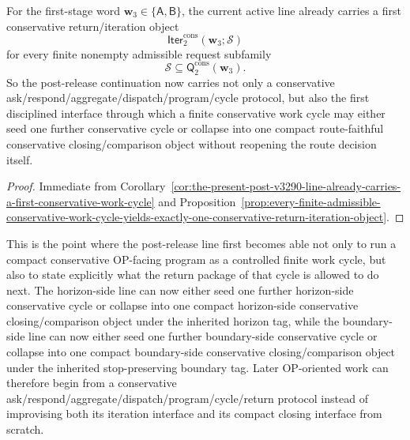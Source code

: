 \begin{corollary}
\label{cor:the-present-post-v3290-line-already-carries-a-first-conservative-return-iteration-interface}
For the first-stage word \(\mathbf w_3\in\{\mathsf A,\mathsf B\}\), the current active line already carries a first conservative return/iteration object
\[
  \mathsf{Iter}^{\mathrm{cons}}_{2}(\mathbf w_3;\mathcal S)
\]
for every finite nonempty admissible request subfamily
\[
  \mathcal S\subseteq \mathsf{Q}^{\mathrm{cons}}_{2}(\mathbf w_3).
\]
So the post-release continuation now carries not only a conservative ask/respond/aggregate/dispatch/program/cycle protocol, but also the first disciplined interface through which a finite conservative work cycle may either seed one further conservative cycle or collapse into one compact route-faithful conservative closing/comparison object without reopening the route decision itself.
\end{corollary}

\begin{proof}
Immediate from Corollary~\ref{cor:the-present-post-v3290-line-already-carries-a-first-conservative-work-cycle} and Proposition~\ref{prop:every-finite-admissible-conservative-work-cycle-yields-exactly-one-conservative-return-iteration-object}.
\end{proof}

\begin{remark}
\label{rem:what-the-first-conservative-cycle-to-return-iteration-interface-now-buys}
This is the point where the post-release line first becomes able not only to run a compact conservative OP-facing program as a controlled finite work cycle, but also to state explicitly what the return package of that cycle is allowed to do next. The horizon-side line can now either seed one further horizon-side conservative cycle or collapse into one compact horizon-side conservative closing/comparison object under the inherited horizon tag, while the boundary-side line can now either seed one further boundary-side conservative cycle or collapse into one compact boundary-side conservative closing/comparison object under the inherited stop-preserving boundary tag. Later OP-oriented work can therefore begin from a conservative ask/respond/aggregate/dispatch/program/cycle/return protocol instead of improvising both its iteration interface and its compact closing interface from scratch.
\end{remark}




